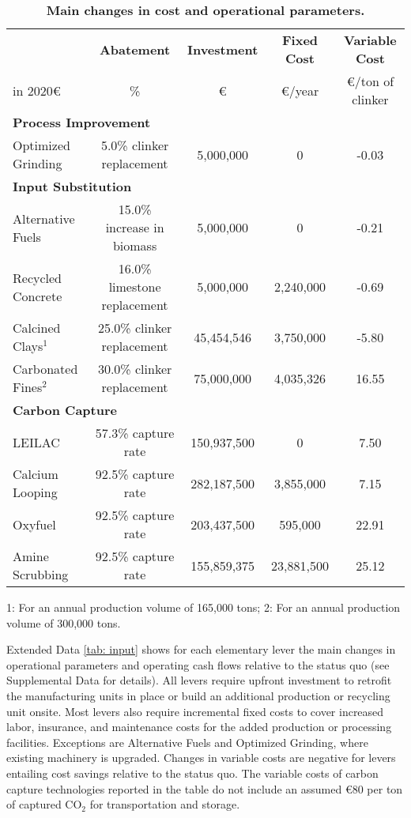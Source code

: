 \documentclass[12pt, a4paper]{article} %
\newcommand{\Suppl}{Supplemental}
\begin{document}
\begin{table}[ht!]
\centering
\begin{threeparttable}
\caption{\textbf{Main changes in cost and operational parameters.}}
\label{tab: input}
\small
\setlength\tabcolsep{3pt} %
\begin{tabular}{l c c c c}
\toprule
& \textbf{Abatement}
& \textbf{Investment}
& \textbf{Fixed Cost}
& \textbf{Variable Cost}
\\
in 2020\euro
& \%
& \euro
& \euro/year
& \euro/ton of clinker
\\
\midrule

\multicolumn{4}{l}{\textbf{Process Improvement}}\\
Optimized Grinding & 5.0\% clinker replacement & 5,000,000 & 0 & -0.03\\
\multicolumn{4}{l}{\textbf{Input Substitution}}\\
Alternative Fuels & 15.0\% increase in biomass & 5,000,000 & 0 & -0.21\\
Recycled Concrete & 16.0\% limestone replacement & 5,000,000 & 2,240,000 & -0.69\\
Calcined Clays$^1$ & 25.0\% clinker replacement & 45,454,546 & 3,750,000 & -5.80\\
Carbonated Fines$^2$ & 30.0\% clinker replacement &  75,000,000 & 4,035,326 & 16.55\\
\multicolumn{4}{l}{\textbf{Carbon Capture}}\\
LEILAC & 57.3\% capture rate & 150,937,500 & 0 & 7.50\\
Calcium Looping & 92.5\% capture rate & 282,187,500 & 3,855,000 & 7.15\\
Oxyfuel & 92.5\% capture rate & 203,437,500 & 595,000 & 22.91\\
Amine Scrubbing & 92.5\% capture rate & 155,859,375 & 23,881,500 & 25.12\\

\bottomrule
\end{tabular}
\begin{tablenotes}
\scriptsize
\item 1: For an annual production volume of 165,000 tons; 2: For an annual production volume of 300,000 tons.
\end{tablenotes}
\end{threeparttable}
\end{table}

Extended Data \autoref{tab: input} shows for each elementary lever the main changes in operational parameters and operating cash flows relative to the status quo (see \Suppl$ $ Data for details). All levers require upfront investment to retrofit the manufacturing units in place or build an additional production or recycling unit onsite. Most levers also require incremental fixed costs to cover increased labor, insurance, and maintenance costs for the added production or processing facilities. Exceptions are Alternative Fuels and Optimized Grinding, where existing machinery is upgraded. Changes in variable costs are negative for levers entailing cost savings relative to the status quo. The variable costs of carbon capture technologies reported in the table do not include an assumed \euro 80 per ton of captured CO$_2$ for transportation and storage.
\end{document}
